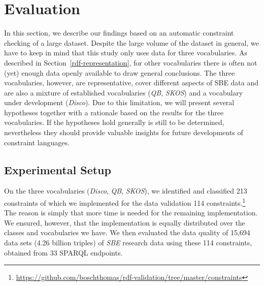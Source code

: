 \documentclass{llncs}
\newcommand{\ke}[1]{\todo[size=\small, color=red!40]{\textbf{Kai:} #1}}
\begin{document}
\section{Evaluation}
\label{evaluation}

In this section, we describe our findings based on an automatic constraint checking of a large dataset. Despite the large volume of the dataset in general, we have to keep in mind that this study only uses data for three vocabularies. As described in Section~\ref{rdf-representation}, for other vocabularies there is often not (yet) enough data openly available to draw general conclusions. The three vocabularies, however, are representative, cover different aspects of SBE data and are also a mixture of established vocabularies (\emph{QB}, \emph{SKOS}) and a vocabulary under development (\emph{Disco}). Due to this limitation, we will present several hypotheses together with a rationale based on the results for the three vocabularies. If the hypotheses hold generally is still to be determined, nevertheless they should provide valuable insights for future developments of constraint languages.

\subsection{Experimental Setup}
\label{implementation}


On the three vocabularies (\emph{Disco}, \emph{QB}, \emph{SKOS}), we identified and classified 213 constraints of which we implemented for the data validation 114 constraints.\footnote{\url{https://github.com/boschthomas/rdf-validation/tree/master/constraints}} The reason is simply that more time is needed for the remaining implementation. We ensured, however, that the implementation is equally distributed over the classes and vocabularies we have. We then evaluated the data quality of 15,694 data sets (4.26 billion triples) of \emph{SBE} research data using these 114 constraints, obtained from 33 SPARQL endpoints.
\end{document}
